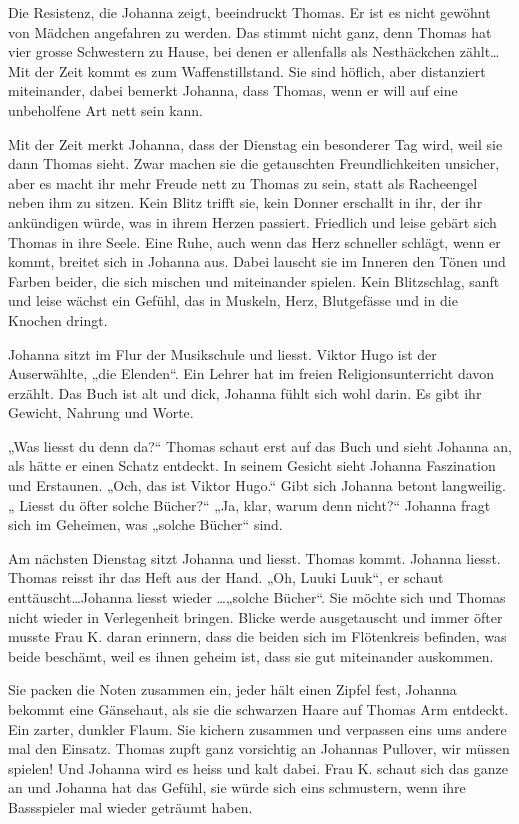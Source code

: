 \documentclass[10pt,titlepage,a5paper]{book}
\begin{document}
Die Resistenz, die Johanna zeigt, beeindruckt Thomas. Er ist es nicht gewöhnt von Mädchen angefahren zu werden. Das stimmt nicht ganz, denn Thomas hat vier grosse Schwestern zu Hause, bei denen er allenfalls als Nesthäckchen zählt\dots  Mit der Zeit kommt es zum Waffenstillstand. Sie sind höflich, aber distanziert miteinander, dabei bemerkt Johanna, dass Thomas, wenn er will auf eine unbeholfene Art nett sein kann.

Mit der Zeit merkt Johanna, dass der Dienstag ein besonderer Tag wird, weil sie dann Thomas sieht. Zwar machen sie die getauschten Freundlichkeiten unsicher, aber es macht ihr mehr Freude nett zu Thomas zu sein, statt als Racheengel neben ihm zu sitzen. Kein Blitz trifft sie, kein Donner erschallt in ihr, der ihr ankündigen würde, was in ihrem Herzen passiert. Friedlich und leise gebärt sich Thomas in ihre Seele. Eine Ruhe, auch wenn das Herz schneller schlägt, wenn er kommt, breitet sich in Johanna aus. Dabei lauscht sie im Inneren den Tönen und Farben beider, die sich mischen und miteinander spielen. Kein Blitzschlag, sanft und leise wächst ein Gefühl, das in Muskeln, Herz, Blutgefässe und in die Knochen dringt.

Johanna sitzt im Flur der Musikschule und liesst. Viktor Hugo ist der Auserwählte, „die Elenden“. Ein Lehrer hat im freien Religionsunterricht davon erzählt. Das Buch ist alt und dick, Johanna fühlt sich wohl darin. Es gibt ihr Gewicht, Nahrung und Worte.

 „Was liesst du denn da?“ Thomas schaut erst auf das Buch und sieht Johanna an, als hätte er einen Schatz entdeckt. In seinem Gesicht sieht Johanna Faszination und Erstaunen. „Och, das ist Viktor Hugo.“ Gibt sich Johanna betont langweilig. „ Liesst du öfter solche Bücher?“  „Ja, klar, warum denn nicht?“ Johanna fragt sich im Geheimen, was „solche Bücher“ sind. 
 
Am nächsten Dienstag sitzt Johanna und liesst. Thomas kommt. Johanna liesst. Thomas reisst ihr das Heft aus der Hand. „Oh, Luuki Luuk“, er schaut enttäuscht\dots  Johanna liesst wieder \dots „solche Bücher“. Sie möchte sich und Thomas nicht wieder in Verlegenheit bringen. 
Blicke werde ausgetauscht und immer öfter musste Frau K. daran erinnern, dass die beiden sich im Flötenkreis befinden, was beide beschämt, weil es ihnen geheim ist, dass sie gut miteinander auskommen.

Sie packen die Noten zusammen ein, jeder hält einen Zipfel fest, Johanna bekommt eine Gänsehaut, als sie die schwarzen Haare auf Thomas Arm entdeckt. Ein zarter, dunkler Flaum. Sie kichern zusammen und verpassen eins ums andere mal den Einsatz. Thomas zupft ganz vorsichtig an Johannas Pullover, wir müssen spielen! Und Johanna wird es heiss und kalt dabei. Frau K. schaut sich das ganze an und Johanna hat das Gefühl, sie würde sich eins schmustern, wenn ihre Bassspieler mal wieder geträumt haben. 
\end{document}
